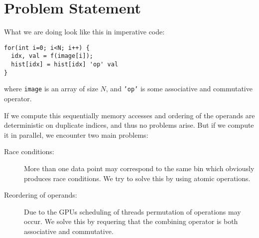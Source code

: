 \chapter{Problem Statement}

What we are doing look like this in imperative code:
%
\begin{verbatim}
for(int i=0; i<N; i++) {
  idx, val = f(image[i]);
  hist[idx] = hist[idx] 'op' val
}
\end{verbatim}
%
where \texttt{image} is an array of size $N$, and
\texttt{'op'} is some associative and commutative
operator.

If we compute this sequentially memory accesses and ordering
of the operands are deterministic on duplicate indices, and
thus no problems arise. But if we compute it in parallel, we
encounter two main problems:
%
\begin{description}
  \item[Race conditions:] More than one data point may
    correspond to the same bin which obviously produces race
    conditions. We try to solve this by using atomic
    operations.

  \item[Reordering of operands:] Due to the GPUs scheduling
    of threads permutation of operations may occur. We solve
    this by requering that the combining operator is both
    associative and commutative.
\end{description}
%
